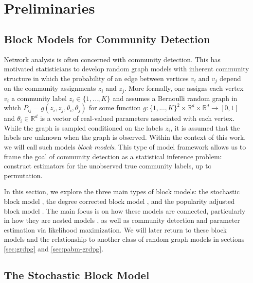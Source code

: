 \documentclass[
  12pt,
]{article}
\theoremstyle{definition}
\theoremstyle{definition}
\theoremstyle{definition}
\theoremstyle{definition}
\theoremstyle{remark}
\begin{document}
\newpage

\hypertarget{preliminaries}{%
\section{Preliminaries}\label{preliminaries}}

\hypertarget{sec:blockmodel}{%
\subsection{Block Models for Community Detection}\label{sec:blockmodel}}

Network analysis is often concerned with community detection.
This has motivated statisticians to develop random graph models with inherent community structure in which the probability of an edge between vertices \(v_i\) and \(v_j\) depend on the community assignments \(z_i\) and \(z_j\).
More formally, one assigns each vertex \(v_i\) a community label \(z_i \in \{1, ..., K\}\) and assumes a Bernoulli random graph in which \(P_{ij} = g(z_i, z_j, \theta_i, \theta_j)\) for some function \(g: \{1, ..., K\}^2 \times \mathbb{R}^d \times \mathbb{R}^d \to [0, 1]\) and \(\theta_i \in \mathbb{R}^d\) is a vector of real-valued parameters associated with each vertex.
While the graph is sampled conditioned on the labels \(z_i\), it is assumed that the labels are unknown when the graph is observed.
Within the context of this work, we will call such models \emph{block models}.
This type of model framework allows us to frame the goal of community detection as a statistical inference problem:
construct estimators for the unobserved true community labels, up to permutation.

In this section, we explore the three main types of block models:
the stochastic block model \citep{doi:10.1080/0022250X.1971.9989788}, the degree corrected block model \citep{Karrer_2011}, and the popularity adjusted block model \citep{307cbeb9b1be48299388437423d94bf1}.
The main focus is on how these models are connected, particularly in how they are nested models \citep{Noroozi2022}, as well as community detection and parameter estimation via likelihood maximization.
We will later return to these block models and the relationship to another class of random graph models in sections \ref{sec:grdpg} and \ref{sec:pabm-grdpg}.

\hypertarget{sec:sbm}{%
\subsection{The Stochastic Block Model}\label{sec:sbm}}
\end{document}
